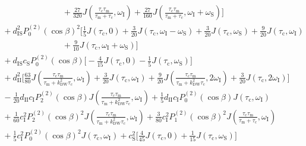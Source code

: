 \begin{appendixtext}
\begin{equation*}
\begin{split}
&\hspace{90pt} +\frac{27}{320}J\left(\frac{\tau_{\text{c}}\tau_{\text{m}}}{\tau_{\text{m}}+\tau_{\text{c}}},\omega_{\text{I}}\right) +\frac{27}{160}J\left(\frac{\tau_{\text{c}}\tau_{\text{m}}}{\tau_{\text{m}}+\tau_{\text{c}}},\omega_{\text{I}}+\omega_{\text{S}}\right)\bigg] \\
&\hspace{4pt}+d_{\text{IS}}^2P_0^{(2)}(\cos\beta)^2\bigg[\frac{1}{5}J(\tau_{\text{c}},0)+\frac{3}{20}J\left(\tau_{\text{c}},\omega_{\text{I}}-\omega_{\text{S}}\right)+\frac{3}{20}J\left(\tau_{\text{c}},\omega_{\text{S}}\right)+\frac{9}{20}J\left(\tau_{\text{c}},\omega_{\text{I}}\right) \\ 
&\hspace{90pt}+\frac{9}{10}J\left(\tau_{\text{c}},\omega_{\text{I}}+\omega_{\text{S}}\right)\bigg] \\
&\hspace{4pt}+d_{\text{IS}}c_{\text{S}}P_0^{(2)}(\cos\beta)\bigg[-\frac{4}{15}J\left(\tau_{\text{c}},0\right)-\frac{1}{5}J\left(\tau_{\text{c}},\omega_{\text{S}}\right)\bigg] \\
&\hspace{4pt}+d_{\text{II}}^2\bigg[\frac{63}{80}J\left(\frac{\tau_{\text{c}}\tau_{\text{m}}}{\tau_{\text{m}}+k_{\text{DW}}^2\tau_{\text{c}}},\omega_{\text{I}}\right)+\frac{3}{20}J\left(\tau_{\text{c}},\omega_{\text{I}}\right)+\frac{9}{20}J\left(\frac{\tau_{\text{c}}\tau_{\text{m}}}{\tau_{\text{m}}+k_{\text{DW}}^2\tau_{\text{c}}},2\omega_{\text{I}}\right)+\frac{3}{20}J\left(\tau_{\text{c}},2\omega_{\text{I}}\right)\bigg] \\
&\hspace{4pt}- \frac{1}{20} d_{\text{II}}c_{\text{I}}P_2^{(2)}(\cos\beta) J\left(\frac{\tau_{\text{c}}\tau_{\text{m}}}{\tau_{\text{m}}+k_{\text{DW}}^2\tau_{\text{c}}},\omega_{\text{I}}\right)+ \frac{1}{5} d_{\text{II}}c_{\text{I}}P_0^{(2)}(\cos\beta) J\left(\tau_{\text{c}},\omega_{\text{I}}\right) \\ 
&\hspace{4pt}+\frac{1}{60} c_{\text{I}}^2P_2^{(2)}(\cos\beta)^2 J\left(\frac{\tau_{\text{c}}\tau_{\text{m}}}{\tau_{\text{m}}+k_{\text{DW}}^2\tau_{\text{c}}},\omega_{\text{I}}\right)+\frac{3}{80} c_{\text{I}}^2P_1^{(2)}(\cos\beta)^2 J\left(\frac{\tau_{\text{c}}\tau_{\text{m}}}{\tau_{\text{m}}+\tau_{\text{c}}},\omega_{\text{I}}\right) \\
&\hspace{4pt}+\frac{1}{5} c_{\text{I}}^2P_0^{(2)}(\cos\beta)^2J\left(\tau_{\text{c}},\omega_{\text{I}}\right)+c_{\text{S}}^2\bigg[\frac{4}{45}J\left(\tau_{\text{c}},0\right)+\frac{1}{15}J(\tau_{\text{c}},\omega_{\text{S}})\bigg]\\

\end{split}
\end{equation*}
\end{appendixtext}
